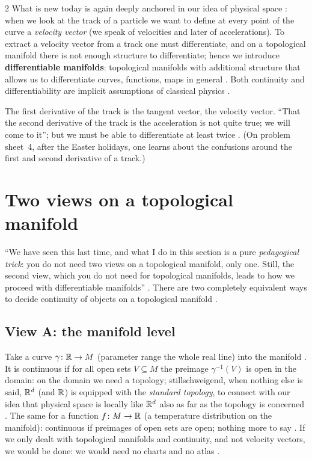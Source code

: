 \begin{paracol}{2}
What is new today is again deeply anchored in our idea of physical space : when we look at the
track of a particle we want to define at every point of the curve a \emph{velocity vector} (we speak of velocities and
later of accelerations). To extract a velocity vector from a track one must differentiate, and on a topological manifold
there is not enough structure to differentiate; hence we introduce \textbf{differentiable manifolds}: topological manifolds
with additional structure that allows us to differentiate curves, functions, maps in general
. Both continuity and differentiability are implicit
assumptions of classical physics .
\begin{coursenote}
The first derivative of the track is the tangent vector, the velocity vector. ``That the second derivative of the track
is the acceleration is not quite true; we will come to it''; but we must be able to differentiate at least twice
. (On problem sheet~4, after the Easter holidays, one learns about the confusions around the
first and second derivative of a track.) 
\end{coursenote}

\section{Two views on a topological manifold}\label{sec:dm-two-views}

``We have seen this last time, and what I do in this section is a pure \emph{pedagogical trick}: you do not need two
views on a topological manifold, only one. Still, the second view, which you do not need for topological manifolds,
leads to how we proceed with differentiable manifolds'' . There are two
completely equivalent ways to decide continuity of objects on a topological manifold .

\subsection{View A: the manifold level}\label{ssec:dm-view-a}

Take a curve $\gamma\colon\mathbb{R}\to M$ (parameter range the whole real line) into the manifold .
It is continuous if for all open sets $V\subseteq M$ the preimage $\gamma^{-1}(V)$ is open in the domain: on the domain we need
a topology; stillschweigend, when nothing else is said, $\mathbb{R}^d$ (and $\mathbb{R}$) is equipped with the
\emph{standard topology}, to connect with our idea that physical space is locally like $\mathbb{R}^d$ also as far as the topology
is concerned .
The same for a function $f\colon M\to\mathbb{R}$ (a temperature distribution on the manifold): continuous if preimages of open
sets are open; nothing more to say . If we only dealt with topological
manifolds and continuity, and not velocity vectors, we would be done: we would need no charts and no atlas
.


\end{paracol}
